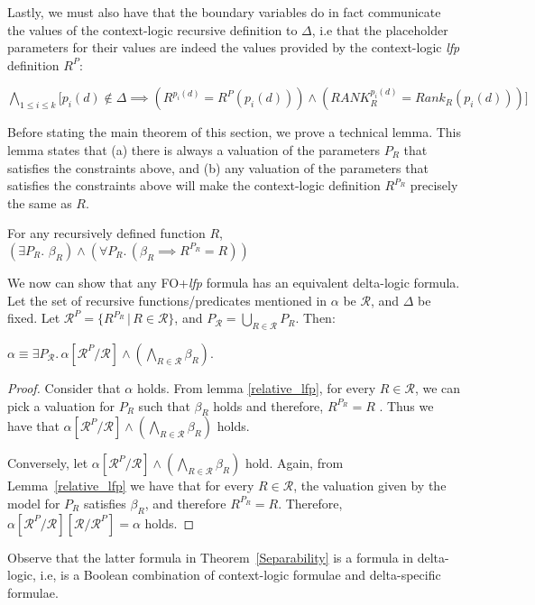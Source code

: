 Lastly, we must also have that the boundary variables do in fact communicate the values of the context-logic recursive definition to $\Delta{}$, i.e that the placeholder parameters for their values are indeed the values provided by the context-logic \textit{lfp} definition $R^{P}$:

$\bigwedge\limits_{1 \leq{} i \leq{} k} \big\lbrack{} p_i(d) \notin{} \Delta{} \implies{}  \left( R^{p_i(d)} =  R^{P}(p_i(d)) \right)  \land{} \left( \textit{RANK}_{R}^{p_i(d)} =  Rank_{R}(p_i(d)) \right) \big\rbrack{}$

Before stating the main theorem of this section, we prove a technical lemma. This lemma states that (a) there is always a valuation of the parameters $P_{R}$ that satisfies the constraints above, and (b) any valuation of the parameters that satisfies the constraints above will make the context-logic definition $R^{P_R}$ precisely the same as $R$.   

\begin{lemma}
\label{relative_lfp}
For any recursively defined function $R$, $\left(\exists{}P_{R}.\,\,\beta_{R} \right) \land{} \left(\forall{}P_{R}.\,\left(\beta_{R} \implies{} R^{P_{R}} = R\right) \right)$
\end{lemma}

We now can show that any FO+\textit{lfp} formula has an equivalent delta-logic formula. Let the set of recursive functions/predicates mentioned in $\alpha{}$ be $\mathcal{R}$, and $\Delta{}$ be fixed. Let $\mathcal{R}^{P} = \{ R^{P_{R}} \,|\, R \in{} \mathcal{R}\}$, and $P_{\mathcal{R}} = \bigcup\limits_{R \in{} \mathcal{R}}P_{R}$. Then:\\

\begin{theorem}[Separability]
\label{Separability}
$\alpha{} \equiv{} \exists{}P_{\mathcal{R}}.\, \alpha[\mathcal{R}^{P}/\mathcal{R}] \land{} \left( \bigwedge\limits_{R \in{} \mathcal{R}} \beta_{R} \right)$.
\end{theorem}

\begin{proof}
Consider that $\alpha{}$ holds. From lemma \ref{relative_lfp}, for every $R \in{} \mathcal{R}$, we can pick a valuation for $P_{R}$ such that $\beta_{R}$ holds and therefore, $R^{P_{R}} = R$ . Thus we have that $\alpha[\mathcal{R}^{P}/\mathcal{R}] \land{} \left( \bigwedge\limits_{R \in{} \mathcal{R}} \beta_{R}\right)$ holds.

Conversely, let $\alpha[\mathcal{R}^{P}/\mathcal{R}] \land{} \left( \bigwedge\limits_{R \in{} \mathcal{R}} \beta_{R} \right)$ hold. Again, from Lemma~\ref{relative_lfp} we have that for every $R \in{} \mathcal{R}$, the valuation given by the model for $P_{R}$ satisfies $\beta_{R}$, and therefore $R^{P_{R}} = R$. Therefore, $\alpha[\mathcal{R}^{P}/\mathcal{R}][\mathcal{R}/\mathcal{R}^{P}] = \alpha{}$ holds.
\end{proof}
Observe that the latter formula in Theorem~\ref{Separability} is a formula in delta-logic, i.e, is a Boolean combination of context-logic formulae and delta-specific formulae.
